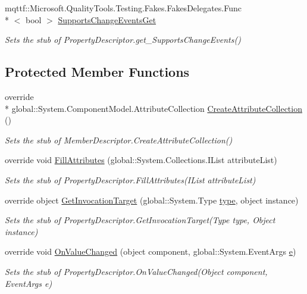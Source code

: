 \begin{DoxyCompactItemize}
mqttf\-::\-Microsoft.\-Quality\-Tools.\-Testing.\-Fakes.\-Fakes\-Delegates.\-Func\\*
$<$ bool $>$ \hyperlink{class_system_1_1_component_model_1_1_fakes_1_1_stub_property_descriptor_ad6d7efd49ace4fd2edc7aec6ae59f00c}{Supports\-Change\-Events\-Get}
\begin{DoxyCompactList}\small\item\em Sets the stub of Property\-Descriptor.\-get\-\_\-\-Supports\-Change\-Events()\end{DoxyCompactList}\end{DoxyCompactItemize}
\subsection*{Protected Member Functions}
\begin{DoxyCompactItemize}
\item 
override \\*
global\-::\-System.\-Component\-Model.\-Attribute\-Collection \hyperlink{class_system_1_1_component_model_1_1_fakes_1_1_stub_property_descriptor_a75f9904568745d32b859216927162644}{Create\-Attribute\-Collection} ()
\begin{DoxyCompactList}\small\item\em Sets the stub of Member\-Descriptor.\-Create\-Attribute\-Collection()\end{DoxyCompactList}\item 
override void \hyperlink{class_system_1_1_component_model_1_1_fakes_1_1_stub_property_descriptor_acea44a7b1d27768c39a79fbbaca6f0ff}{Fill\-Attributes} (global\-::\-System.\-Collections.\-I\-List attribute\-List)
\begin{DoxyCompactList}\small\item\em Sets the stub of Property\-Descriptor.\-Fill\-Attributes(\-I\-List attribute\-List)\end{DoxyCompactList}\item 
override object \hyperlink{class_system_1_1_component_model_1_1_fakes_1_1_stub_property_descriptor_a796f799db490d041d0cda70d07262a43}{Get\-Invocation\-Target} (global\-::\-System.\-Type \hyperlink{jquery-1_810_82-vsdoc_8js_a3940565e83a9bfd10d95ffd27536da91}{type}, object instance)
\begin{DoxyCompactList}\small\item\em Sets the stub of Property\-Descriptor.\-Get\-Invocation\-Target(\-Type type, Object instance)\end{DoxyCompactList}\item 
override void \hyperlink{class_system_1_1_component_model_1_1_fakes_1_1_stub_property_descriptor_abbeaf7f7fb6730f6beb17ee8dcc188f8}{On\-Value\-Changed} (object component, global\-::\-System.\-Event\-Args \hyperlink{jquery-1_810_82_8min_8js_a2c038346d47955cbe2cb91e338edd7e1}{e})
\begin{DoxyCompactList}\small\item\em Sets the stub of Property\-Descriptor.\-On\-Value\-Changed(\-Object component, Event\-Args e)\end{DoxyCompactList}\end{DoxyCompactItemize}
